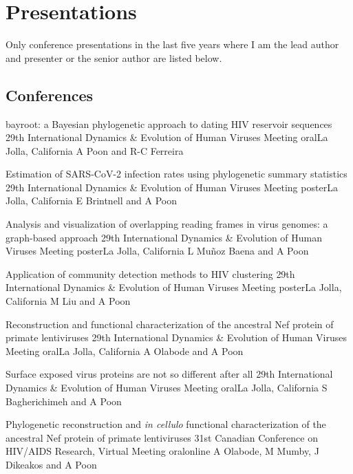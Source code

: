 
\section {Presentations}

Only conference presentations in the last five years where I am the lead author and presenter or the senior author are listed below.

\subsection {Conferences}

{bayroot: a Bayesian phylogenetic approach to dating HIV reservoir sequences}
{29th International Dynamics \& Evolution of Human Viruses Meeting}
{oral}{La Jolla, California}
{A Poon and R-C Ferreira}{}

{Estimation of SARS-CoV-2 infection rates using phylogenetic summary statistics}
{29th International Dynamics \& Evolution of Human Viruses Meeting}
{poster}{La Jolla, California}
{E Brintnell and A Poon}{}

{Analysis and visualization of overlapping reading frames in virus genomes: a graph-based approach}
{29th International Dynamics \& Evolution of Human Viruses Meeting}
{poster}{La Jolla, California}
{L Mu\~noz Baena and A Poon}{}

{Application of community detection methods to HIV clustering}
{29th International Dynamics \& Evolution of Human Viruses Meeting}
{poster}{La Jolla, California}
{M Liu and A Poon}{}

{Reconstruction and functional characterization of the ancestral Nef protein of primate lentiviruses}
{29th International Dynamics \& Evolution of Human Viruses Meeting}
{oral}{La Jolla, California}
{A Olabode and A Poon}{}

{Surface exposed virus proteins are not so different after all}
{29th International Dynamics \& Evolution of Human Viruses Meeting}
{oral}{La Jolla, California}
{S Bagherichimeh and A Poon}{}

{Phylogenetic reconstruction and \textit{in cellulo} functional characterization of the ancestral Nef protein of primate lentiviruses}
{31st Canadian Conference on HIV/AIDS Research, Virtual Meeting}
{oral}{online}
{A Olabode, M Mumby, J Dikeakos and A Poon}{}

